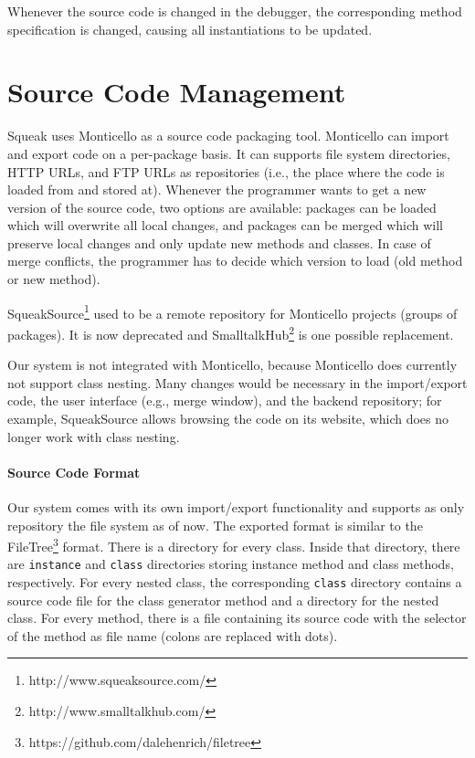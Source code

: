 Whenever the source code is changed in the debugger, the corresponding method specification is changed, causing all instantiations to be updated.

\section{Source Code Management}
Squeak uses Monticello as a source code packaging tool. Monticello can import and export code on a per-package basis. It can supports file system directories, HTTP URLs, and FTP URLs as repositories (i.e., the place where the code is loaded from and stored at). Whenever the programmer wants to get a new version of the source code, two options are available: packages can be loaded which will overwrite all local changes, and packages can be merged which will preserve local changes and only update new methods and classes. In case of merge conflicts, the programmer has to decide which version to load (old method or new method).

SqueakSource\footnote{http://www.squeaksource.com/} used to be a remote repository for Monticello projects (groups of packages). It is now deprecated and SmalltalkHub\footnote{http://www.smalltalkhub.com/} is one possible replacement.

Our system is not integrated with Monticello, because Monticello does currently not support class nesting. Many changes would be necessary in the import/export code, the user interface (e.g., merge window), and the backend repository; for example, SqueakSource allows browsing the code on its website, which does no longer work with class nesting.

\paragraph{Source Code Format}
Our system comes with its own import/export functionality and supports as only repository the file system as of now. The exported format is similar to the FileTree\footnote{https://github.com/dalehenrich/filetree} format. There is a directory for every class. Inside that directory, there are \texttt{instance} and \texttt{class} directories storing instance method and class methods, respectively. For every nested class, the corresponding \texttt{class} directory contains a source code file for the class generator method and a directory for the nested class. For every method, there is a file containing its source code with the selector of the method as file name (colons are replaced with dots).

